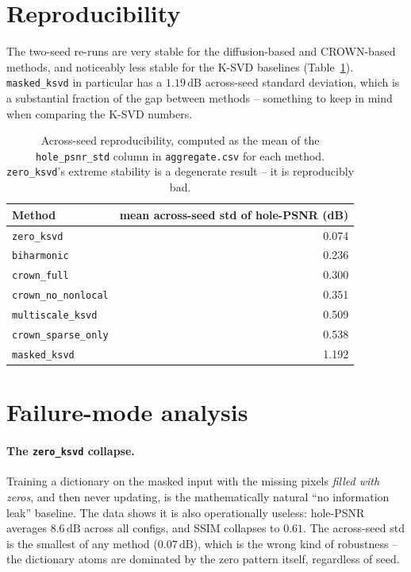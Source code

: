 \documentclass[11pt,a4paper]{article}
\newcommand{\method}[1]{\texttt{#1}}
\newcommand{\dB}{\,\textrm{dB}}
\begin{document}
\section{Reproducibility}\label{sec:reproducibility}

The two-seed re-runs are very stable for the diffusion-based and
CROWN-based methods, and noticeably less stable for the K-SVD
baselines (Table~\ref{tab:reproducibility}). \method{masked\_ksvd}
in particular has a $1.19\dB$ across-seed standard deviation,
which is a substantial fraction of the gap between methods --
something to keep in mind when comparing the K-SVD numbers.

\begin{table}[h]
\centering\small
\begin{tabular}{lr}
\toprule
Method & mean across-seed std of hole-PSNR (dB) \\
\midrule
\method{zero\_ksvd}           & 0.074 \\
\method{biharmonic}           & 0.236 \\
\method{crown\_full}          & 0.300 \\
\method{crown\_no\_nonlocal}  & 0.351 \\
\method{multiscale\_ksvd}     & 0.509 \\
\method{crown\_sparse\_only}  & 0.538 \\
\method{masked\_ksvd}         & 1.192 \\
\bottomrule
\end{tabular}
\caption{Across-seed reproducibility, computed as the mean of the
\texttt{hole\_psnr\_std} column in \texttt{aggregate.csv} for each
method. \method{zero\_ksvd}'s extreme stability is a degenerate
result -- it is reproducibly bad.}
\label{tab:reproducibility}
\end{table}

\section{Failure-mode analysis}\label{sec:failures}

\paragraph{The \method{zero\_ksvd} collapse.} Training a
dictionary on the masked input with the missing pixels
\emph{filled with zeros}, and then never updating, is the
mathematically natural ``no information leak'' baseline. The data
shows it is also operationally useless: hole-PSNR averages
$8.6\dB$ across all configs, and SSIM collapses to $0.61$. The
across-seed std is the smallest of any method ($0.07\dB$), which
is the wrong kind of robustness -- the dictionary atoms are
dominated by the zero pattern itself, regardless of seed.
\end{document}
